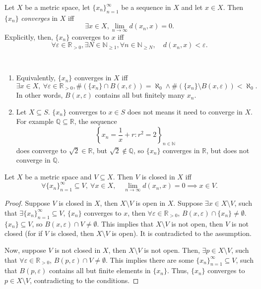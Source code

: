 \begin{definition}
	Let $X$ be a metric space, let $\{x_n\}_{n = 1}^{\infty}$ be a sequence in $X$ and let $x \in X$. Then $\{x_n\}$ \textit{converges} in $X$ iff
	$$
	\exists x \in X, \lim_{n \to \infty} d(x_n, x) = 0.
	$$
	Explicitly, then, $\{ x_n \}$ converges to $x$ iff
	$$
	\forall \varepsilon \in \mathbb R_{> 0}, \exists N \in \mathbb N_{\ge 1}, \forall n \in \mathbb N_{\ge N}, \quad d(x_n , x) < \varepsilon.
	$$
\end{definition}


\begin{note} \ 
	\begin{enumerate}
		\item Equivalently, $\{x_n\}$ converges in $X$ iff
			$$
			\exists x \in X, \ \forall \varepsilon \in \mathbb R_{>0}, \# (\{ x_n \} \cap B(x,\varepsilon)) = \aleph_0 \land \# ( \{x_n\} \setminus B(x, \varepsilon)) < \aleph_0.
			$$
			In other words, $B(x, \varepsilon)$ contains all but finitely many $x_n$.
		\item Let $X \subseteq S$. $\{x_n\}$ converges to $x \in S$ does not means it need to converge in $X$. For example $\mathbb Q \subseteq \mathbb R$, the sequence
			$$
			\left\{ x_n = \frac{1}{x} + r : r^2 = 2 \right\}_{n \in \mathbb N}
			$$
			does converge to $\sqrt{2} \in \mathbb R$, but $\sqrt{2} \notin \mathbb Q$, so $\{x_n\}$ converges in $\mathbb R$, but does not converge in $\mathbb Q$.
	\end{enumerate}
\end{note}


\begin{lemma}
	Let $X$ be a metric space and $V \subseteq X$. Then $V$ is closed in $X$ iff
	$$
	\forall \{x_n\}_{n = 1}^\infty \subseteq V, \ \forall x \in X, \quad \lim_{n \to \infty} d(x_n, x) = 0 \implies x \in V.
	$$
\end{lemma}


\begin{proof}
	Suppose $V$ is closed in $X$, then $X \setminus V$ is open in $X$. Suppose $\exists x \in X \setminus V$, such that $\exists \{x_n\}_{n = 1}^\infty \subseteq V$, $\{x_n\}$ converges to $x$, then $\forall \varepsilon \in \mathbb R_{> 0}$, $B(x, \varepsilon) \cap \{x_n\} \ne \emptyset$. $\{x_n\} \subseteq V$, so $B(x, \varepsilon) \cap V \ne \emptyset$. This implies that $X \setminus V$ is not open, then $V$ is not closed (for if $V$ is closed, then $X \setminus V$ is open). It is contradicted to the assumption.
	
	Now, suppose $V$ is not closed in $X$, then $X \setminus V$ is not open. Then, $\exists p \in X \setminus V$, such that $\forall \varepsilon \in \mathbb R_{> 0}$, $B(p, \varepsilon) \cap V \ne \emptyset$. This implies there are some $\{x_n\}_{n = 1}^\infty \subseteq V$, such that $B(p, \varepsilon)$ contains all but finite elements in $\{x_n\}$. Thus, $\{x_n\}$ converges to $p \in X \setminus V$, contradicting to the conditions.
\end{proof}


